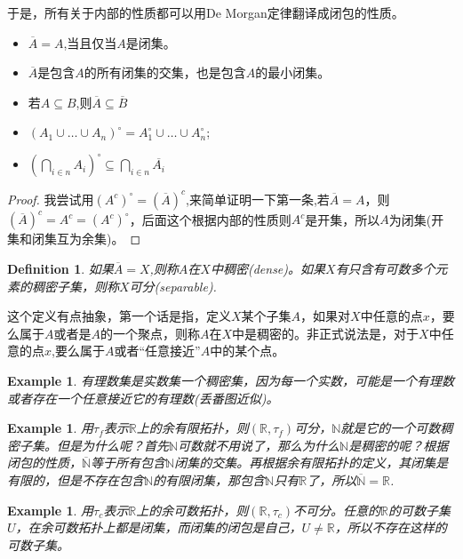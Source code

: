 \documentclass{article}
\newtheorem{example}[theorem]{Example}
\newtheorem{definition}[theorem]{Definition}
\begin{document}
于是，所有关于内部的性质都可以用De Morgan定律翻译成闭包的性质。

\begin{itemize}
	\item $\overline{A} = A$,当且仅当$A$是闭集。
	\item $\overline{A}$是包含$A$的所有闭集的交集，也是包含$A$的最小闭集。
	\item 若$A \subseteq B$,则$\overline{A} \subseteq \overline{B}$
	\item $(A_1 \cup \ldots \cup A_n)^{\circ}=A_1^{\circ} \cup \ldots \cup A_n^{\circ}$;
	\item ${\left(\bigcap\limits_{i \in n} A_i\right)}^{\circ} \subseteq \bigcap\limits_{i \in n} \overline{A_i}$
\end{itemize}

\begin{proof}
我尝试用$(A^{c})^{\circ}=(\overline{A})^c$,来简单证明一下第一条,若$\overline{A}=A$，则$(\overline{A})^c = A^c=(A^{c})^{\circ}$，后面这个根据内部的性质则$A^c$是开集，所以$A$为闭集(开集和闭集互为余集)。
\end{proof}


\begin{definition}
如果$\overline{A}=X$,则称$A$在$X$中稠密(dense)。如果$X$有只含有可数多个元素的稠密子集，则称$X$可分(separable).
\end{definition}

这个定义有点抽象，第一个话是指，定义$X$某个子集$A$，如果对$X$中任意的点$x$，要么属于$A$或者是$A$的一个聚点，则称$A$在$X$中是稠密的。非正式说法是，对于$X$中任意的点$x$,要么属于$A$或者“任意接近”$A$中的某个点。

\begin{example}
有理数集是实数集一个稠密集，因为每一个实数，可能是一个有理数或者存在一个任意接近它的有理数(丢番图近似)。
\end{example}

\begin{example}
用$\tau_f$表示$\mathbb{R}$上的余有限拓扑，则$(\mathbb{R},\tau_f)$可分，$\mathbb{N}$就是它的一个可数稠密子集。但是为什么呢？首先$\mathbb{N}$可数就不用说了，那么为什么$\mathbb{N}$是稠密的呢？根据闭包的性质，$\overline{\mathbb{N}}$等于所有包含$\mathbb{N}$闭集的交集。再根据余有限拓扑的定义，其闭集是有限的，但是不存在包含$\mathbb{N}$的有限闭集，那包含$\mathbb{N}$只有$\mathbb{R}$了，所以$\overline{\mathbb{N}}=\mathbb{R}$.
\end{example}

\begin{example}
用$\tau_c$表示$\mathbb{R}$上的余可数拓扑，则$(\mathbb{R},\tau_c)$不可分。任意的$\mathbb{R}$的可数子集$U$，在余可数拓扑上都是闭集，而闭集的闭包是自己，$U \neq \mathbb{R}$，所以不存在这样的可数子集。
\end{example}
\end{document}
